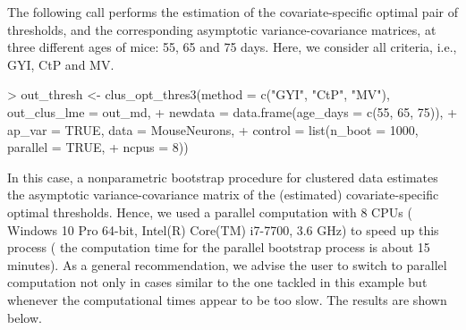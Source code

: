 The following call performs the estimation of the covariate-specific optimal pair of thresholds, and the corresponding asymptotic variance-covariance matrices, at three different ages of mice: 55, 65 and 75 days. Here, we consider all criteria, i.e., GYI, CtP and MV.
{
\begin{example}
> out_thresh <- clus_opt_thres3(method = c("GYI", "CtP", "MV"), out_clus_lme = out_md,
+                               newdata = data.frame(age_days = c(55, 65, 75)),
+                               ap_var = TRUE, data = MouseNeurons,
+                               control = list(n_boot = 1000, parallel = TRUE, 
+                                              ncpus = 8))
\end{example}
}
\noindent
In this case, a nonparametric bootstrap procedure for clustered data estimates the asymptotic variance-covariance matrix of the (estimated) covariate-specific optimal thresholds. Hence, we used a parallel computation with 8 CPUs {(\color{blue} Windows 10 Pro 64-bit, Intel(R) Core(TM) i7-7700, 3.6 GHz)} to speed up this process {(\color{blue} the computation time for the parallel bootstrap process is about 15 minutes)}. {\color{blue} As a general recommendation, we advise the user to switch to parallel computation not only in cases similar to the one tackled in this example but whenever the computational times appear to be too slow.} The results are shown below.
